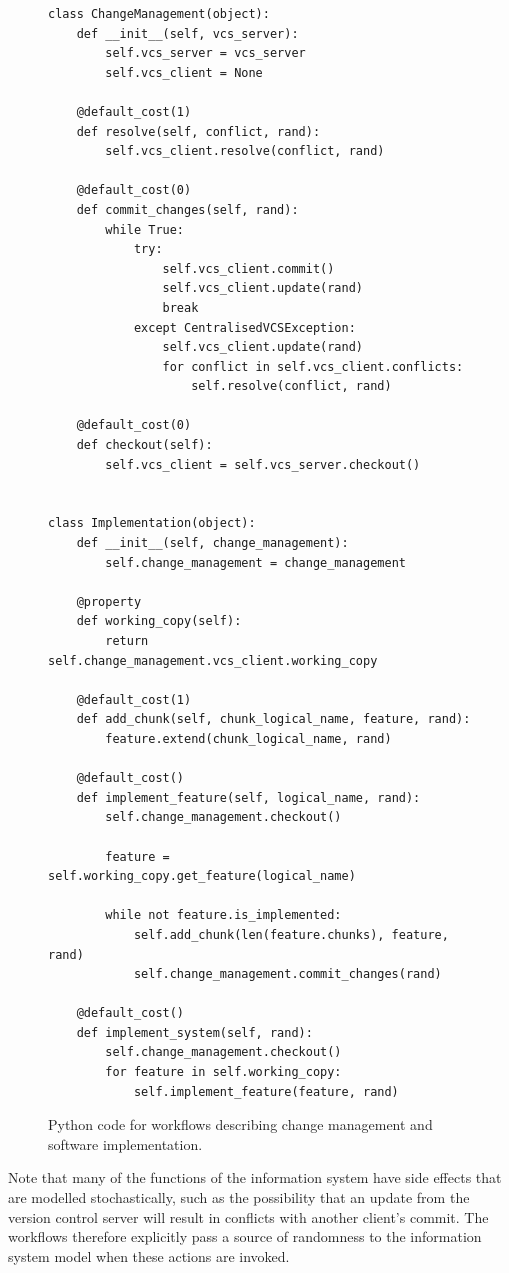 \documentclass{llncs}
\begin{document}
\begin{figure}
  \centering
\begin{lstlisting}
class ChangeManagement(object):
    def __init__(self, vcs_server):
        self.vcs_server = vcs_server
        self.vcs_client = None

    @default_cost(1)
    def resolve(self, conflict, rand):
        self.vcs_client.resolve(conflict, rand)

    @default_cost(0)
    def commit_changes(self, rand):
        while True:
            try:
                self.vcs_client.commit()
                self.vcs_client.update(rand)
                break
            except CentralisedVCSException:
                self.vcs_client.update(rand)
                for conflict in self.vcs_client.conflicts:
                    self.resolve(conflict, rand)

    @default_cost(0)
    def checkout(self):
        self.vcs_client = self.vcs_server.checkout()


class Implementation(object):
    def __init__(self, change_management):
        self.change_management = change_management

    @property
    def working_copy(self):
        return self.change_management.vcs_client.working_copy

    @default_cost(1)
    def add_chunk(self, chunk_logical_name, feature, rand):
        feature.extend(chunk_logical_name, rand)

    @default_cost()
    def implement_feature(self, logical_name, rand):
        self.change_management.checkout()

        feature = self.working_copy.get_feature(logical_name)

        while not feature.is_implemented:
            self.add_chunk(len(feature.chunks), feature, rand)
            self.change_management.commit_changes(rand)

    @default_cost()
    def implement_system(self, rand):
        self.change_management.checkout()
        for feature in self.working_copy:
            self.implement_feature(feature, rand)

\end{lstlisting}
  \caption{Python code for workflows describing change management and software implementation.}
  \label{fig:workflows}

\end{figure}

Note that many of the functions of the information system have side effects that are modelled stochastically, such as
the possibility that an update from the version control server will result in conflicts with another client's commit.
The workflows therefore explicitly pass a source of randomness to the information system model when these actions are
invoked.
\end{document}
